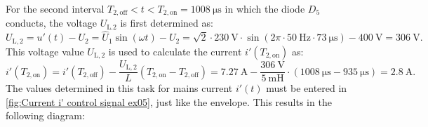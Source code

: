\begin{solutionblock}
     For the second interval $T_\mathrm{2,off} < t < T_\mathrm{2,on} = \SI{1008}{\micro\s}$ in which the diode $D_\mathrm{5}$ conducts, the voltage $U_\mathrm{L.2}$ is first determined as:
     \begin{equation}
        U_\mathrm{L,2} = u'(t) - U_\mathrm{2}= \hat U_\mathrm{1} \sin(\omega t) - U_\mathrm{2} = \sqrt{2} \cdot \SI{230}{\volt} \cdot \sin(2\pi \cdot \SI{50}{\hertz}\cdot \SI{73}{\micro\s}) - \SI{400}{\volt} = \SI{306}{\volt}.
    \end{equation}
    This voltage value  $U_\mathrm{L,2}$ is used to calculate the current  $i'(T_\mathrm{2,on})$ as:
    \begin{equation}
        i'(T_\mathrm{2,on}) = i'(T_\mathrm{2,off}) -\frac{ U_\mathrm{L,2}}{L}(T_\mathrm{2,on}-T_\mathrm{2,off}) = \SI{7.27}{\ampere} -\frac{\SI{306}{\volt}}{\SI{5}{\milli\henry}}\cdot (\SI{1008}{\micro\s}-\SI{935}{\micro\s}) = \SI{2.8}{\ampere}.
    \end{equation}
    The values determined in this task for mains current
    $i'(t)$ must be entered in \autoref{fig:Current i' control signal ex05}, just like the envelope. This results in the following diagram:
\end{solutionblock}






